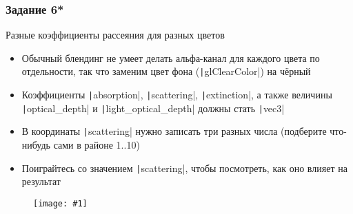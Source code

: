 \documentclass[10pt]{beamer}
\newcommand{\slideimage}[1]{
  \begin{figure}
    \begin{adjustbox}{width=\textwidth, totalheight=\textheight-2\baselineskip-2\baselineskip,keepaspectratio}
      \texttt{[image: \#1]}
    \end{adjustbox}
  \end{figure}
}
\begin{document}
\begin{frame}[fragile]
\frametitle{Задание 6*}
Разные коэффициенты рассеяния для разных цветов
\begin{itemize}
\item Обычный блендинг не умеет делать альфа-канал для каждого цвета по отдельности, так что заменим цвет фона (\texttt|glClearColor|) на чёрный
\item Коэффициенты \texttt|absorption|, \texttt|scattering|, \texttt|extinction|, а также величины \texttt|optical_depth| и \texttt|light_optical_depth| должны стать \texttt|vec3|
\item В координаты \texttt|scattering| нужно записать три разных числа (подберите что-нибудь сами в районе 1..10)
\item Поиграйтесь со значением \texttt|scattering|, чтобы посмотреть, как оно влияет на результат
\end{itemize}
\end{frame}

\begin{frame}[fragile]
\slideimage{6.png}
\end{frame}
\end{document}
